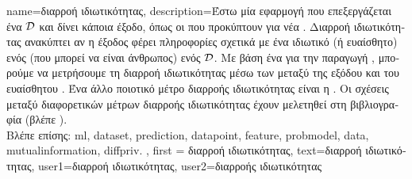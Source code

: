 {name={\foreignlanguage{greek}{διαρροή ιδιωτικότητας}},
	description={\foreignlanguage{greek}{Έστω μία εφαρμογή}  
		\foreignlanguage{greek}{που επεξεργάζεται ένα} 
		 $\mathcal{D}$ \foreignlanguage{greek}{και δίνει κάποια έξοδο, όπως οι}  
		\foreignlanguage{greek}{που προκύπτουν για νέα} . \foreignlanguage{greek}{Διαρροή ιδιωτικότητας ανακύπτει 
		αν η έξοδος φέρει πληροφορίες σχετικά με ένα ιδιωτικό (ή ευαίσθητο)}  \foreignlanguage{greek}{ενός} 
		 \foreignlanguage{greek}{(που μπορεί να είναι άνθρωπος) ενός $\mathcal{D}$. Με βάση ένα}  
		\foreignlanguage{greek}{για την παραγωγή} , \foreignlanguage{greek}{μπορούμε να μετρήσουμε τη διαρροή ιδιωτικότητας 
		μέσω των}  \foreignlanguage{greek}{μεταξύ της εξόδου και του ευαίσθητου} 
		. \foreignlanguage{greek}{Ένα άλλο ποιοτικό μέτρο διαρροής ιδιωτικότητας είναι η}  
		. \foreignlanguage{greek}{Οι σχέσεις μεταξύ διαφορετικών μέτρων διαρροής ιδιωτικότητας έχουν μελετηθεί  
		στη βιβλιογραφία (βλέπε} \cite{InfThDiffPriv}).\\
	\foreignlanguage{greek}{Βλέπε επίσης:} \gls{ml}, \gls{dataset}, \gls{prediction}, \gls{datapoint}, \gls{feature}, \gls{probmodel}, \gls{data}, \gls{mutualinformation}, \gls{diffpriv}. 
	}, 
	first = {\foreignlanguage{greek}{διαρροή ιδιωτικότητας}}, 
	text={\foreignlanguage{greek}{διαρροή ιδιωτικότητας}},
	user1={\foreignlanguage{greek}{διαρροή ιδιωτικότητας}}, %
   	user2={\foreignlanguage{greek}{διαρροής ιδιωτικότητας}} %
}


